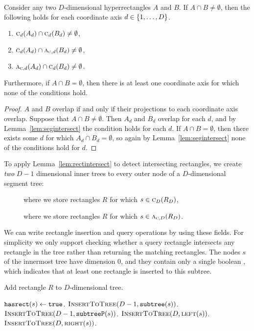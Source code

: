 \documentclass[english,gradu]{tktltiki2018}
\begin{document}
\begin{lem}\label{lem:rectintersect}Consider any two $D$-dimensional hyperrectangles $A$ and $B$.
If $A\cap B\neq\emptyset$, then the following holds for each coordinate axis $d\in\set{1,\dots,D}$.
\begin{enumerate}
\item $\canoni{A_d}{d}\cap\canoni{B_d}{d}\neq\emptyset$,
\item $\canoni{A_d}{d}\cap\canonpari{B_d}{d}\neq\emptyset$,
\item $\canonpari{A_d}{d}\cap\canoni{B_d}{d}\neq\emptyset$.
\end{enumerate}
Furthermore, if $A\cap B=\emptyset$, then there is at least one coordinate axis for which none of the conditions hold.
\end{lem}
\begin{proof}
$A$ and $B$ overlap if and only if their projections to each coordinate axis overlap.
Suppose that $A\cap B\neq\emptyset$.
Then $A_d$ and $B_d$ overlap for each $d$, and by Lemma~\ref{lem:segintersect} the condition holds for each $d$.
If $A\cap B=\emptyset$, then there exists some $d$ for which $A_d\cap B_d=\emptyset$, so again by Lemma~\ref{lem:segintersect} none of the conditions hold for $d$.
\end{proof}

To apply Lemma~\ref{lem:rectintersect} to detect intersecting rectangles, we create \emph{two} $D-1$ dimensional inner trees to every outer node of a $D$-dimensional segment tree:
\begin{description}
\item[] where we store rectangles $R$ for which $s\in\canoni{R_D}{D}$,
\item[] where we store rectangles $R$ for which $s\in\canonpari{R_D}{D}$.
\end{description}

We can write rectangle insertion and query operations by using these fields.
For simplicity we only support checking whether a query rectangle intersects any rectangle in the tree rather than returning the matching rectangles.
The nodes $s$ of the innermost tree have dimension 0, and they contain only a single boolean , which indicates that at least one rectangle is inserted to this subtree.

\begin{alg}\label{alg:rectadd}
Add rectangle $R$ to $D$-dimensional tree.
\begin{algorithmic}
		\State $\hasrect{s}\gets\texttt{true}$.
		\State $\adddt(D-1,\subtree{s})$.
		\State $\adddt(D-1,\subtreep{s})$.
		\State $\adddt(D,\leftc{s})$.
		\State $\adddt(D,\rightc{s})$.
	\EndIf
\EndProcedure
\end{algorithmic}
\end{alg}
\end{document}
